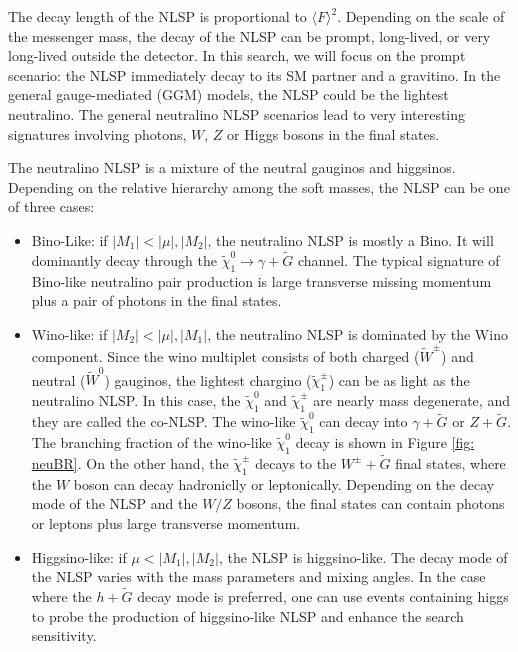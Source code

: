 \documentclass[thesis.tex]{subfiles}
\begin{document}
The decay length of the NLSP is proportional to $\langle F \rangle^2$. 
Depending on the scale of the messenger mass, the decay of the NLSP can be prompt, long-lived, or very long-lived outside the detector. 
In this search, we will focus on the prompt scenario: the NLSP immediately decay to its SM partner and a gravitino. 
In the general gauge-mediated (GGM) models, the NLSP could be the lightest neutralino. 
The general neutralino NLSP scenarios lead to very interesting signatures involving photons, $W$, $Z$ or Higgs bosons in the final states. 

The neutralino NLSP is a mixture of the neutral gauginos and higgsinos. 
Depending on the relative hierarchy among the soft masses, the NLSP can be one of three cases:
\begin{itemize}
	\item Bino-Like: if $|M_1| < |\mu|,|M_2|$, the neutralino NLSP is mostly a Bino. It will dominantly decay through the $\tilde{\chi}_1^0 \rightarrow \gamma + \tilde{G}$ channel. 
	         The typical signature of Bino-like neutralino pair production is large transverse missing momentum plus a pair of photons in the final states.  
	\item Wino-like: if $|M_2| < |\mu|, |M_1|$, the neutralino NLSP is dominated by the Wino component. 
		Since the wino multiplet consists of both charged ($\tilde{W}^\pm$) and neutral ($\tilde{W}^0$) gauginos, the lightest chargino ($\tilde{\chi}_1^\pm$) can be as light as the neutralino NLSP. 
		In this case, the $\tilde{\chi}_1^0$ and $\tilde{\chi}_1^\pm$ are nearly mass degenerate, and they are called the co-NLSP. 
		The wino-like $\tilde{\chi}_1^0$ can decay into $\gamma + \tilde{G}$ or $Z + \tilde{G}$. 
		The branching fraction of the wino-like $\tilde{\chi}_1^0$ decay is shown in Figure \ref{fig: neuBR}. 
		On the other hand, the $\tilde{\chi}_1^\pm$ decays to the $W^\pm+ \tilde{G}$ final states, where the $W$ boson can decay hadroniclly or leptonically. 
		Depending on the decay mode of the NLSP and the $W/Z$ bosons, the final states can contain photons or leptons plus large transverse momentum. 
	\item Higgsino-like: if $\mu < |M_1|, |M_2|$, the NLSP is higgsino-like. The decay mode of the NLSP varies with the mass parameters and mixing angles. In the case where the $h + \tilde{G}$ decay mode is preferred, one can use events containing higgs to probe the production of higgsino-like NLSP and enhance the search sensitivity. 
\end{itemize}
\end{document}
